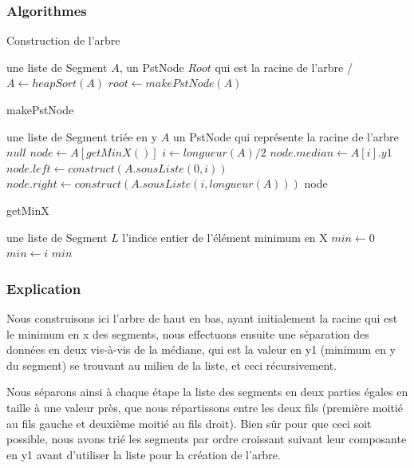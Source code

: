 \documentclass[10pt,a4paper]{article}
\begin{document}
\subsubsection{Algorithmes}

\begin{algorithm}
\caption{Construction de l'arbre}
\begin{algorithmic}[1]
\REQUIRE une liste de Segment $A$, un PstNode $Root$ qui est la racine de l'arbre 
\ENSURE /
\STATE $A \leftarrow heapSort(A)$
\STATE $root \leftarrow makePstNode(A) $
\end{algorithmic}
\end{algorithm}

\begin{algorithm}
\caption{makePstNode}
\begin{algorithmic}[1]
\REQUIRE une liste de Segment triée en y $A$ 
\ENSURE un PstNode qui représente la racine de l'arbre
\RETURN $null$
\ENDIF
\STATE $node \leftarrow A[getMinX()] $
\STATE $i \leftarrow longueur(A)/2$
\STATE $node.median \leftarrow A[i].y1 $
\STATE $node.left \leftarrow construct(A.sousListe(0,i)) $
\STATE $node.right \leftarrow construct(A.sousListe(i,longueur(A))) $
\ENDIF
\RETURN node
\end{algorithmic}
\end{algorithm}
\newpage
\begin{algorithm}
\caption{getMinX}
\begin{algorithmic}[1]
\REQUIRE une liste de Segment $L$
\ENSURE l'indice entier de l’élément minimum en X
\ENDIF
\STATE $min \leftarrow 0$
\STATE $min \leftarrow i$
\ENDIF
\ENDFOR
\RETURN $min$
\end{algorithmic}
\end{algorithm}

\subsubsection{Explication}

Nous construisons ici l'arbre de haut en bas, ayant initialement la racine qui est le minimum en x des segments, nous effectuons ensuite une séparation des données en deux vis-à-vis de la médiane, qui est la valeur en y1 (minimum en y du segment) se trouvant au milieu de la liste, et ceci récursivement. 

Nous séparons ainsi à chaque étape la liste des segments en deux parties égales en taille à une valeur près, que nous répartissons entre les deux fils (première moitié au fils gauche et deuxième moitié au fils droit). Bien sûr pour que ceci soit possible, nous avons trié les segments par ordre croissant suivant leur composante en y1 avant d'utiliser la liste pour la création de l'arbre.
\end{document}
